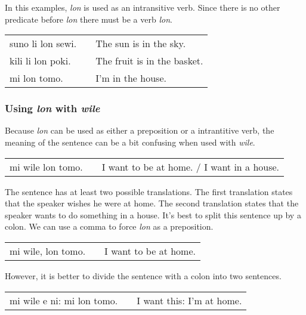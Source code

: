 In this examples, \textit{lon} is used as an intransitive verb. 
Since there is no other predicate before \textit{lon} there must be a verb \textit{lon}.

\begin{supertabular}{p{5,5cm}|ll}
suno li lon sewi. && The sun is in the sky. \\
kili li lon poki. && The fruit is in the basket. \\
mi lon tomo. && I'm in the house. \\
\end{supertabular} 
%
\subsubsection*{Using \textit{lon} with \textit{wile}}
%
Because \textit{lon} can be used as either a preposition or a intrantitive verb, the meaning of the sentence can be a bit confusing when used with \textit{wile}. 

\begin{supertabular}{p{5,5cm}|ll}
mi wile lon tomo. && I want to be at home. / I want in a house. \\
\end{supertabular} 

The sentence has at least two possible translations. 
The first translation states that the speaker wishes he were at home. 
The second translation states that the speaker wants to do something in a house. 
It's best to split this sentence up by a colon.
We can use a comma to force \textit{lon} as a preposition.

\begin{supertabular}{p{5,5cm}|ll}
mi wile, lon tomo. && I want to be at home. \\
\end{supertabular}

However, it is better to divide the sentence with a colon into two sentences.

\begin{supertabular}{p{5,5cm}|ll}
mi wile e ni: mi lon tomo. && I want this: I'm at home. \\
\end{supertabular} 

